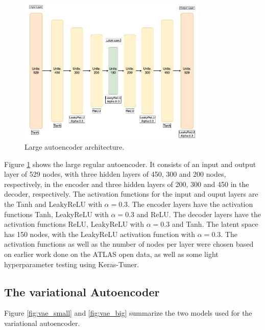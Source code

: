\begin{figure}[h!]
    \centering
    \includegraphics[width=0.8\textwidth]{Figures/nnarchitect/ae_big.jpeg}
    \caption[AE | Large network architecture]{Large autoencoder architecture.}
    \label{fig:ae_big}
\end{figure}

Figure \ref{fig:ae_big} shows the large regular autoencoder. It consists of an input and output layer of 529 nodes, with three 
hidden layers of 450, 300 and 200 nodes, respectively, in the encoder and three hidden layers of 200, 300 and 450 in the decoder, respectively. 
The activation functions for the input and ouput layers are the Tanh and LeakyReLU with $\alpha=0.3$. The encoder layers 
have the activation functions Tanh, LeakyReLU with $\alpha=0.3$ and ReLU. The decoder layers have the activation functions ReLU, 
LeakyReLU with $\alpha=0.3$ and Tanh. The latent space has 150 nodes,
with the LeakyReLU activation function with $\alpha=0.3$. The activation functions as well as the number of nodes per layer were chosen 
based on earlier work done 
on the ATLAS open data\cite{fys5555}, as well as some light hyperparameter testing using Keras-Tuner\cite{omalley2019kerastuner}.
\subsection*{The variational Autoencoder}
Figure \ref{fig:vae_small} and \ref{fig:vae_big} summarize the two models used for the variational autoencoder. 

